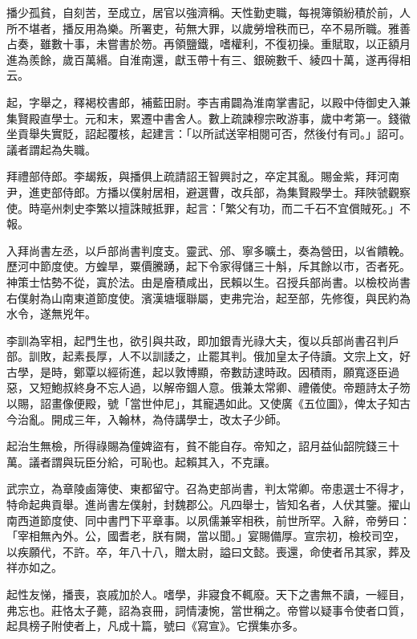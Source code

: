 \begin{pinyinscope}
 播少孤貧，自刻苦，至成立，居官以強濟稱。天性勤吏職，每視簿領紛積於前，人所不堪者，播反用為樂。所署吏，茍無大罪，以歲勞增秩而已，卒不易所職。雅善占奏，雖數十事，未嘗書於笏。再領鹽鐵，嗜權利，不復初操。重賦取，以正額月進為羨餘，歲百萬緡。自淮南還，獻玉帶十有三、銀碗數千、綾四十萬，遂再得相云。



 起，字舉之，釋褐校書郎，補藍田尉。李吉甫闢為淮南掌書記，以殿中侍御史入兼集賢殿直學士。元和末，累遷中書舍人。數上疏諫穆宗畋游事，歲中考第一。錢徽坐貢舉失實貶，詔起覆核，起建言：「以所試送宰相閱可否，然後付有司。」詔可。議者謂起為失職。



 拜禮部侍郎。李朅叛，與播俱上疏請詔王智興討之，卒定其亂。賜金紫，拜河南尹，進吏部侍郎。方播以僕射居相，避選曹，改兵部，為集賢殿學士。拜陜虢觀察使。時亳州刺史李繁以擅誅賊抵罪，起言：「繁父有功，而二千石不宜償賊死。」不報。



 入拜尚書左丞，以戶部尚書判度支。靈武、邠、寧多曠土，奏為營田，以省饋輓。歷河中節度使。方蝗旱，粟價騰踴，起下令家得儲三十斛，斥其餘以市，否者死。神策士怙勢不從，寘於法。由是廥積咸出，民賴以生。召授兵部尚書。以檢校尚書右僕射為山南東道節度使。濱漢塘堰聯屬，吏弗完治，起至部，先修復，與民約為水令，遂無兇年。



 李訓為宰相，起門生也，欲引與共政，即加銀青光祿大夫，復以兵部尚書召判戶部。訓敗，起素長厚，人不以訓諉之，止罷其判。俄加皇太子侍讀。文宗上文，好古學，是時，鄭覃以經術進，起以敦博顯，帝數訪逮時政。因積雨，願寬逐臣過惡，又短鮑叔終身不忘人過，以解帝錮人意。俄兼太常卿、禮儀使。帝題詩太子笏以賜，詔畫像便殿，號「當世仲尼」，其寵遇如此。又使廣《五位圖》，俾太子知古今治亂。開成三年，入翰林，為侍講學士，改太子少師。



 起治生無檢，所得祿賜為僮婢盜有，貧不能自存。帝知之，詔月益仙韶院錢三十萬。議者謂與玩臣分給，可恥也。起賴其入，不克讓。



 武宗立，為章陵鹵簿使、東都留守。召為吏部尚書，判太常卿。帝患選士不得才，特命起典貢舉。進尚書左僕射，封魏郡公。凡四舉士，皆知名者，人伏其鑒。擢山南西道節度使、同中書門下平章事。以夙儒兼宰相秩，前世所罕。入辭，帝勞曰：「宰相無內外。公，國耆老，朕有闕，當以聞。」宴賜備厚。宣宗初，檢校司空，以疾願代，不許。卒，年八十八，贈太尉，謚曰文懿。喪還，命使者吊其家，葬及祥亦如之。



 起性友悌，播喪，哀戚加於人。嗜學，非寢食不輒廢。天下之書無不讀，一經目，弗忘也。莊恪太子薨，詔為哀冊，詞情淒惋，當世稱之。帝嘗以疑事令使者口質，起具榜子附使者上，凡成十篇，號曰《寫宣》。它撰集亦多。




\end{pinyinscope}
